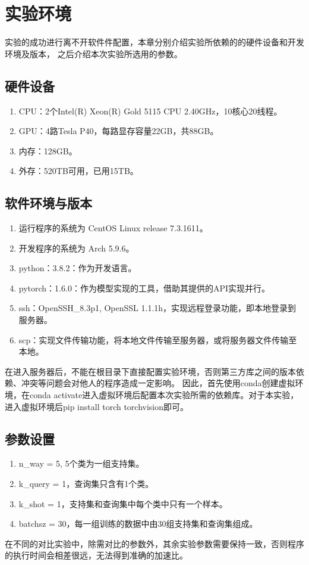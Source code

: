 \section{实验环境}

实验的成功进行离不开软件件配置，本章分别介绍实验所依赖的的硬件设备和开发环境及版本，
之后介绍本次实验所选用的参数。

\subsection{硬件设备}

\begin{enumerate}[itemsep=-1ex,partopsep=1ex]
    \item CPU：2个Intel(R) Xeon(R) Gold 5115 CPU \@ 2.40GHz，10核心20线程。
    \item GPU：4路Tesla P40，每路显存容量22GB，共88GB。
    \item 内存：128GB。
    \item 外存：520TB可用，已用15TB。
\end{enumerate}

\subsection{软件环境与版本}

\begin{enumerate}[itemsep=-1ex,partopsep=1ex]
    \item 运行程序的系统为 CentOS Linux release 7.3.1611。
    \item 开发程序的系统为 Arch 5.9.6。
    \item python：3.8.2：作为开发语言。
    \item pytorch：1.6.0：作为模型实现的工具，借助其提供的API实现并行。
    \item ssh：OpenSSH\_8.3p1, OpenSSL 1.1.1h，实现远程登录功能，即本地登录到服务器。
    \item scp：实现文件传输功能，将本地文件传输至服务器，或将服务器文件传输至本地。
\end{enumerate}

在进入服务器后，不能在根目录下直接配置实验环境，否则第三方库之间的版本依赖、冲突等问题会对他人的程序造成一定影响。
因此，首先使用conda创建虚拟环境，在conda activate进入虚拟环境后配置本次实验所需的依赖库。对于本实验，
进入虚拟环境后pip install torch torchvision即可。

\subsection{参数设置}

\begin{enumerate}[itemsep=-1ex,partopsep=1ex]
    \item n\_way = 5, 5个类为一组支持集。
    \item k\_query = 1，查询集只含有1个类。
    \item k\_shot = 1，支持集和查询集中每个类中只有一个样本。
    \item batchsz = 30，每一组训练的数据中由30组支持集和查询集组成。
\end{enumerate}

在不同的对比实验中，除需对比的参数外，其余实验参数需要保持一致，否则程序的执行时间会相差很远，无法得到准确的加速比。